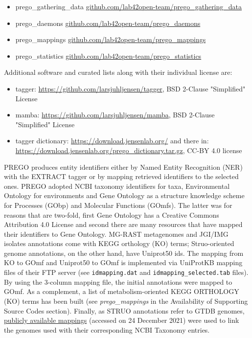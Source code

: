 {   \begin{itemize}
      \item prego\_gathering\_data 
      \href{https://github.com/lab42open-team/prego_gathering_data}{github.com/lab42open-team/prego\_gathering\_data}
      \item prego\_daemons \href{https://github.com/lab42open-team/prego_daemons}{github.com/lab42open-team/prego\_daemons}
      \item prego\_mappings \href{https://github.com/lab42open-team/prego_mappings}{github.com/lab42open-team/prego\_mappings} 
      \item prego\_statistics \href{https://github.com/lab42open-team/prego_statistics}{github.com/lab42open-team/prego\_statistics}
   \end{itemize}

   Additional software and curated lists along with their individual license are:
   \begin{itemize}
      \item tagger:	\href{https://github.com/larsjuhljensen/tagger}{https://github.com/larsjuhljensen/tagger}, BSD 2-Clause "Simplified" License
      \item mamba: \href{https://github.com/larsjuhljensen/mamba}{https://github.com/larsjuhljensen/mamba}, BSD 2-Clause "Simplified" License 
      \item tagger dictionary:  \href{https://download.jensenlab.org/}{https://download.jensenlab.org/} and there in: \\
      \href{https://download.jensenlab.org/prego_dictionary.tar.gz}{https://download.jensenlab.org/prego\_dictionary.tar.gz}, CC-BY 4.0 license
   \end{itemize}


PREGO produces entity identifiers either by Named Entity Recognition (NER) with the EXTRACT tagger or by mapping retrieved identifiers to the selected ones. 
PREGO adopted NCBI taxonomy identifiers for taxa, Environmental Ontology for environments and Gene Ontology as a structure knowledge scheme for Processes (GObp) and Molecular Functions (GOmfs). 
The latter was for reasons that are two-fold, first Gene Ontology has a Creative Commons Attribution 4.0 License and second there are many resources that have mapped their identifiers to Gene Ontology.
MG-RAST metagenomes and JGI/IMG isolates annotations come with KEGG orthology (KO) terms; 
Struo-oriented genome annotations, on the other hand, have Uniprot50 ids. 
The mapping from KO to GOmf and Uniprot50 to GOmf is implemented via UniProtKB mapping files of their FTP server (see \texttt{idmapping.dat} and \texttt{idmapping\_selected.tab} files). 
By using the 3-column mapping file, the initial annotations were mapped to GOmf. As a complement, a list of metabolism-oriented KEGG ORTHOLOGY (KO) terms has been built (see \textit{prego\_mappings} in the Availability of Supporting Source Codes section).
Finally, as STRUO annotations refer to GTDB genomes, \href{http://ftp.tue.mpg.de/ebio/projects/struo/GTDB_release89/metadata/}{publicly available mappings} (accessed on 24 December 2021) were used to link the genomes used with their corresponding NCBI Taxonomy entries.



}
